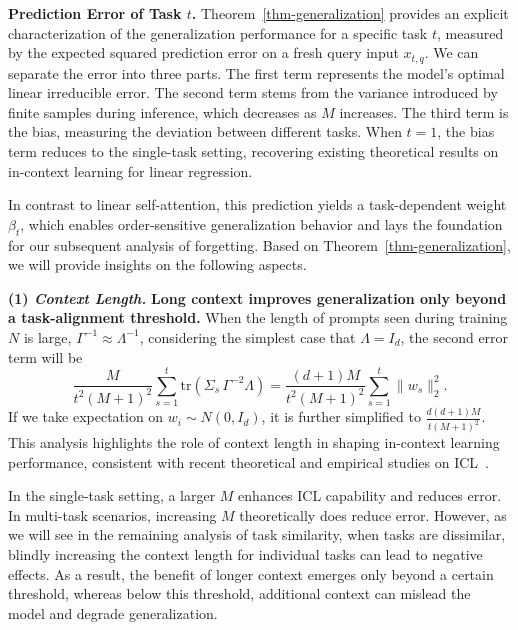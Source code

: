 \documentclass{article}
\theoremstyle{plain}
\theoremstyle{definition}
\theoremstyle{remark}
\begin{document}
\noindent\textbf{Prediction Error of Task $t$.} 
Theorem~\ref{thm-generalization} provides an explicit characterization of the generalization performance for a specific task $t$, measured by the expected squared prediction error on a fresh query input $x_{t,q}$. We can separate the error into three parts. The first term represents the model's optimal linear irreducible error. The second term stems from the variance introduced by finite samples during inference, which decreases as $M$ increases. The third term is the bias, measuring the deviation between different tasks. When $t=1$, the bias term reduces to the single-task setting, recovering existing theoretical results on in-context learning for linear regression. 

In contrast to linear self-attention, this prediction yields a task-dependent weight $\beta_t$, which enables order-sensitive generalization behavior and lays the foundation for our subsequent analysis of forgetting. Based on Theorem~\ref{thm-generalization}, we will provide insights on the following aspects.

\noindent \textbf{(1) \textit{Context Length.}} \textbf{Long context improves generalization only beyond a task-alignment threshold.}
When the length of prompts seen during training $N$ is large, $\Gamma^{-1} \approx \Lambda^{-1}$, considering the simplest case that $\Lambda = I_d$, the second error term will be 
\begin{equation*}
    \frac{M}{t^2(M+1)^2}\sum_{s=1}^t \mathrm{tr}(\Sigma_s\,\Gamma^{-2}\Lambda)
    = \frac{(d+1)M}{t^2(M+1)^2}\sum_{s=1}^t \|w_s\|_2^2 .
\end{equation*}
If we take expectation on $w_i\sim N(0,I_d)$, it is further simplified to $\frac{d(d+1)M}{t(M+1)^2}$. This analysis highlights the role of context length in shaping in-context learning performance, consistent with recent theoretical and empirical studies on ICL~\citep{zhang2024trained,kang2025incontextlearningperformcontinual,Lu_2025}. 

In the single-task setting, a larger $M$ enhances ICL capability and reduces error. In multi-task scenarios, increasing $M$ theoretically does reduce error. However, as we will see in the remaining analysis of task similarity, when tasks are dissimilar, blindly increasing the context length for individual tasks can lead to negative effects. As a result, the benefit of longer context emerges only beyond a certain threshold, whereas below this threshold, additional context can mislead the model and degrade generalization.
\end{document}
